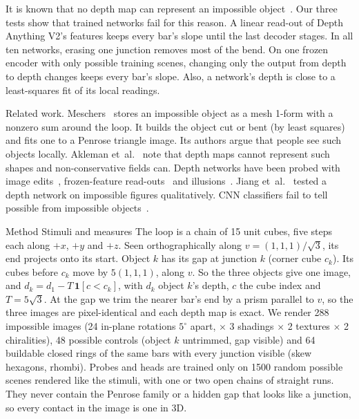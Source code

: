 \documentclass[10pt,twocolumn,letterpaper]{article}
\makeatletter
\renewcommand\paragraph{\@startsection{paragraph}{4}{\z@}{1.1ex \@plus.4ex \@minus.2ex}{-1em}%
  {\normalfont\normalsize\bfseries}}
\renewcommand\section{\@startsection{section}{1}{\z@}{-2.2ex \@plus -.5ex \@minus -.2ex}{1.1ex \@plus.2ex}%
  {\normalfont\Large\bfseries}}
\renewcommand\subsection{\@startsection{subsection}{2}{\z@}{-2ex\@plus -.5ex \@minus -.2ex}{.8ex \@plus .2ex}%
  {\normalfont\large\bfseries}}
\makeatother
\begin{document}
It is known that no depth map can represent an impossible
object~\cite{penrose1992cohomology,akleman2023inconsistent,dodik2025meschers}. Our three tests show that trained
networks fail for this reason. A linear read-out of Depth Anything V2's features keeps every bar's slope until the last decoder
stages. In all ten networks, erasing one junction removes most of the bend. On one frozen encoder with only possible training
scenes, changing only the output from depth to depth changes keeps every bar's slope.
Also, a network's depth is close to a least-squares fit of its local readings.

\paragraph{Related work.}
Meschers~\cite{dodik2025meschers} stores an impossible object as a mesh 1-form with a nonzero sum around
the loop. It builds the object cut or bent (by least squares) and fits one to a Penrose triangle image. Its authors argue that people
see such objects locally. Akleman et~al.~\cite{akleman2023inconsistent} note that depth maps cannot represent such shapes
and non-conservative fields can. Depth networks have been probed with image
edits~\cite{vandijk2019how}, frozen-feature read-outs~\cite{elbanani2024probing,danier2025depthcues} and
illusions~\cite{yao2025illusion,nguyen2026mirage}. Jiang et~al.~\cite{jiang2019illusions} tested a depth network on
impossible figures qualitatively. CNN classifiers fail to tell possible from impossible
objects~\cite{heinke2021failure}.

\section{Method}
\subsection{Stimuli and measures}\label{sec:readout}
The loop is a chain of 15 unit cubes, five steps each along $+x$, $+y$ and $+z$. Seen orthographically along
$v=(1,1,1)/\sqrt3$, its end projects onto its start. Object $k$ has its gap at junction $k$ (corner cube $c_k$). Its cubes before $c_k$ move by $5(1,1,1)$, along $v$. So the three objects give one image, and
\mbox{$d_k=d_1-T\,\mathbf 1[c<c_k]$}, with $d_k$ object $k$'s depth, $c$ the cube index and $T=5\sqrt3$. At
the gap we trim the nearer bar's end by a prism parallel to $v$, so the three images are pixel-identical and each depth
map is exact. We render 288 impossible images (24 in-plane rotations $5^\circ$ apart, $\times$ 3 shadings $\times$ 2
textures $\times$ 2 chiralities), 48 possible controls (object $k$ untrimmed, gap visible) and 64 buildable closed rings
of the same bars with every junction visible (skew hexagons, rhombi). Probes and heads are trained only on 1500 random
possible scenes rendered like the stimuli, with one or two open chains of straight runs. They never contain the Penrose
family or a hidden gap that looks like a junction, so every contact in the image is one in 3D.
\end{document}
